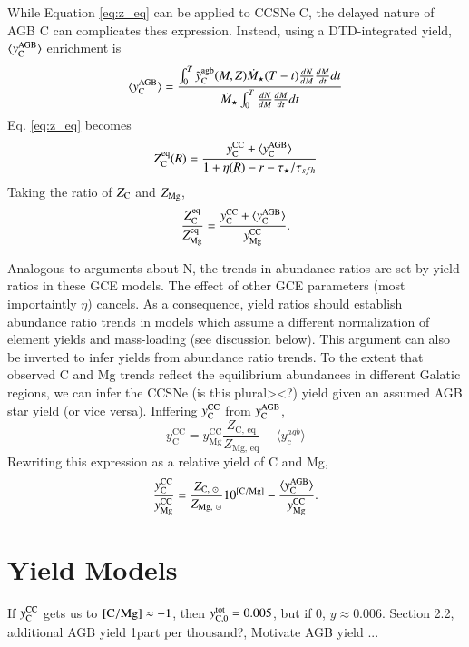 \documentclass[12pt,oneside]{report}
\newcommand{\Ycc}{\ensuremath{y_{\rm C}^{\rm CC}}}
\newcommand{\Yct}{\ensuremath{y_{\rm C, 0}^{\rm tot}}}
\newcommand{\Yoc}{\ensuremath{y_{\rm Mg}^{\rm CC}}}
\newcommand{\Ycagb}{\ensuremath{y_{\rm C}^{\rm AGB}}}
\begin{document}
While Equation \ref{eq:z_eq} can be applied to CCSNe C, the delayed nature of AGB C can complicates thes expression. Instead, using a DTD-integrated yield, $\langle \Ycagb \rangle$ enrichment is
\begin{equation}
    \langle \Ycagb\rangle = \frac{\int_0^T \tilde{y}_{\rm C}^{\rm agb}(M, Z) \dot{M}_\star(T - t) \frac{dN}{dM} \frac{dM}{dt} dt  }{ \dot{M}_\star \int_0^T \frac{dN}{dM} \frac{dM}{dt} dt}
\end{equation}
Eq. \ref{eq:z_eq} becomes
\begin{equation}
    Z_{\rm C}^{\rm eq}(R) = \frac{\Ycc + \langle\Ycagb\rangle}{1 + \eta(R) - r - \tau_\star / \tau_{sfh}}
\end{equation}
Taking the ratio of $Z_{\rm C}$ and $Z_{\rm Mg}$, 
\begin{equation}\label{eq:z_co}
    \frac{Z_{\rm C}^{\rm eq}}{Z_{\rm Mg}^{\rm eq}} = \frac{\Ycc + \langle \Ycagb \rangle }{\Yoc}.
\end{equation}

Analogous to \cite{james+22} arguments about N, the trends in abundance ratios are set by yield ratios in these GCE models. The effect of other GCE parameters (most importaintly $\eta$) cancels. As a consequence, yield ratios should establish abundance ratio trends in models which assume a different normalization of element yields and mass-loading (see discussion below).
This argument can also be inverted to infer  yields from abundance ratio trends. To the extent that observed C and Mg trends reflect the equilibrium abundances in different Galatic regions, we can infer the CCSNe (is this plural><?) yield given an assumed AGB star yield (or vice versa). Inffering $\Ycc$ from $\Ycagb$, 
\begin{equation}
    y_\text{C}^\text{CC} =  y_\text{Mg}^\text{CC} \frac{Z_\text{C,~eq}}{Z_\text{Mg,~eq}} - \langle y_c^{agb} \rangle
\end{equation}
Rewriting this expression as a relative yield of C and Mg,
\begin{equation}
    \frac{\Ycc}{\Yoc} = \frac{Z_{\text{C},~\odot}}{Z_{\text{Mg},~\odot}} 10^{\rm [C/Mg]} - \frac{\langle \Ycagb \rangle}{\Yoc}.
\end{equation}

\section{Yield Models}

If $\Ycc$ gets us to ${\rm [C/Mg] } \approx -1$, then $\Yct = 0.005$, but if 0, $y\approx0.006$. 
Section 2.2, additional AGB yield 1part per thousand?, Motivate AGB yield ...
\end{document}
